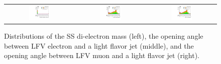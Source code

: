 \begin{figure}[tbh!]
 \begin{center}
 \begin{tabular}{ccc}
  \includegraphics[width=0.325\textwidth]{figures/Appendix/SRMC/SSZmass}&
    \includegraphics[width=0.325\textwidth]{figures/Appendix/SRMC/JeDr}&
  \includegraphics[width=0.325\textwidth]{figures/Appendix/SRMC/JmuDr}\\
 \end{tabular}
 \caption{Distributions of the \ac{SS} di-electron mass (left), the opening angle between LFV electron and a light flavor jet (middle), and the opening angle between LFV muon and a light flavor jet (right).}
 \label{fig:input_vali_5}
 \end{center}
\end{figure}

